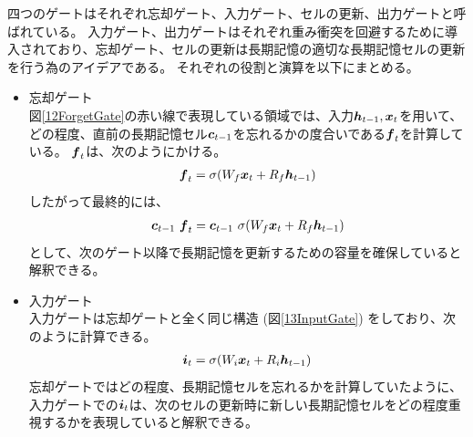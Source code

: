 四つのゲートはそれぞれ忘却ゲート、入力ゲート、セルの更新、出力ゲートと呼ばれている。
入力ゲート、出力ゲートはそれぞれ重み衝突を回避するために導入されており、忘却ゲート、セルの更新は長期記憶の適切な長期記憶セルの更新を行う為のアイデアである。
それぞれの役割と演算を以下にまとめる。

\begin{itemize}
  \item 忘却ゲート\\
  図\ref{12ForgetGate}の赤い線で表現している領域では、入力${\mbox{\boldmath{$h$}}}_{t-1},{\mbox{\boldmath{$x$}}}_t$を用いて、どの程度、直前の長期記憶セル${\mbox{\boldmath{$c$}}}_{t-1}$を忘れるかの度合いである${\mbox{\boldmath{$f$}}}_{t}$を計算している。
  ${\mbox{\boldmath{$f$}}}_{t}$は、次のようにかける。
\begin{equation}
 \begin{split}
  {\mbox{\boldmath{$f$}}}_{t} = \sigma (W_f {\mbox{\boldmath{$x$}}}_t + R_f {\mbox{\boldmath{$h$}}}_{t-1})
 \end{split}
\end{equation}  
  したがって最終的には、
\begin{equation}
 \begin{split}
  {\mbox{\boldmath{$c$}}}_{t-1} \  {\mbox{\boldmath{$f$}}}_{t} 
  = {\mbox{\boldmath{$c$}}}_{t-1} \  \sigma (W_f {\mbox{\boldmath{$x$}}}_t + R_f {\mbox{\boldmath{$h$}}}_{t-1})
 \end{split}
\end{equation}
  として、次のゲート以降で長期記憶を更新するための容量を確保していると解釈できる。

  \item 入力ゲート\\
  入力ゲートは忘却ゲートと全く同じ構造 (図\ref{13InputGate}) をしており、次のように計算できる。
\begin{equation}
 \begin{split}
  {\mbox{\boldmath{$i$}}}_{t} = \sigma (W_i {\mbox{\boldmath{$x$}}}_t + R_i {\mbox{\boldmath{$h$}}}_{t-1})
 \end{split}
\end{equation}
  忘却ゲートではどの程度、長期記憶セルを忘れるかを計算していたように、入力ゲートでの${\mbox{\boldmath{$i$}}}_{t}$は、次のセルの更新時に新しい長期記憶セルをどの程度重視するかを表現していると解釈できる。
    

\end{itemize}
